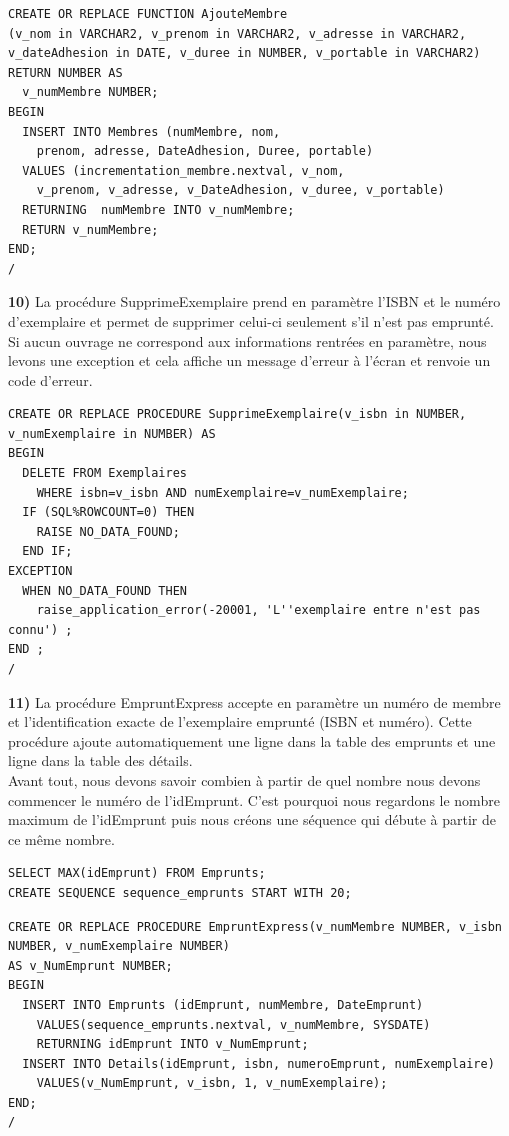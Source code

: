 \documentclass[a4paper,12pt]{article}
\begin{document}
\begin{lstlisting}
CREATE OR REPLACE FUNCTION AjouteMembre 
(v_nom in VARCHAR2, v_prenom in VARCHAR2, v_adresse in VARCHAR2, v_dateAdhesion in DATE, v_duree in NUMBER, v_portable in VARCHAR2)  
RETURN NUMBER AS 
  v_numMembre NUMBER;
BEGIN
  INSERT INTO Membres (numMembre, nom, 
    prenom, adresse, DateAdhesion, Duree, portable) 
  VALUES (incrementation_membre.nextval, v_nom, 
    v_prenom, v_adresse, v_DateAdhesion, v_duree, v_portable) 
  RETURNING  numMembre INTO v_numMembre;
  RETURN v_numMembre;
END;
/
\end{lstlisting}
\clearpage
\textbf {10)} La procédure SupprimeExemplaire prend en paramètre l’ISBN et le numéro d’exemplaire et permet de supprimer celui-ci seulement s'il n'est pas emprunté.\\
Si aucun ouvrage ne correspond aux informations rentrées en paramètre, nous levons une exception et cela affiche un message d'erreur à l'écran et renvoie un code d'erreur.

\begin{lstlisting}
CREATE OR REPLACE PROCEDURE SupprimeExemplaire(v_isbn in NUMBER, v_numExemplaire in NUMBER) AS
BEGIN
  DELETE FROM Exemplaires 
    WHERE isbn=v_isbn AND numExemplaire=v_numExemplaire;
  IF (SQL%ROWCOUNT=0) THEN
    RAISE NO_DATA_FOUND;
  END IF;
EXCEPTION
  WHEN NO_DATA_FOUND THEN
    raise_application_error(-20001, 'L''exemplaire entre n'est pas connu') ;
END ;
/
\end{lstlisting} 

\textbf {11)} La procédure EmpruntExpress accepte en paramètre un numéro de membre et l’identification exacte de l’exemplaire emprunté (ISBN et numéro). Cette procédure ajoute automatiquement une ligne dans la table des emprunts et une ligne dans la table des détails. \\
Avant tout, nous devons savoir combien à partir de quel nombre nous devons commencer le numéro de l'idEmprunt. C'est pourquoi nous regardons le nombre maximum de l'idEmprunt puis nous créons une séquence qui débute à partir de ce même nombre.

\begin{lstlisting}
SELECT MAX(idEmprunt) FROM Emprunts;
CREATE SEQUENCE sequence_emprunts START WITH 20;
\end{lstlisting}
\begin{lstlisting}
CREATE OR REPLACE PROCEDURE EmpruntExpress(v_numMembre NUMBER, v_isbn NUMBER, v_numExemplaire NUMBER) 
AS v_NumEmprunt NUMBER;
BEGIN
  INSERT INTO Emprunts (idEmprunt, numMembre, DateEmprunt)
    VALUES(sequence_emprunts.nextval, v_numMembre, SYSDATE)
    RETURNING idEmprunt INTO v_NumEmprunt;
  INSERT INTO Details(idEmprunt, isbn, numeroEmprunt, numExemplaire)
    VALUES(v_NumEmprunt, v_isbn, 1, v_numExemplaire);
END;
/
\end{lstlisting} 
\end{document}

